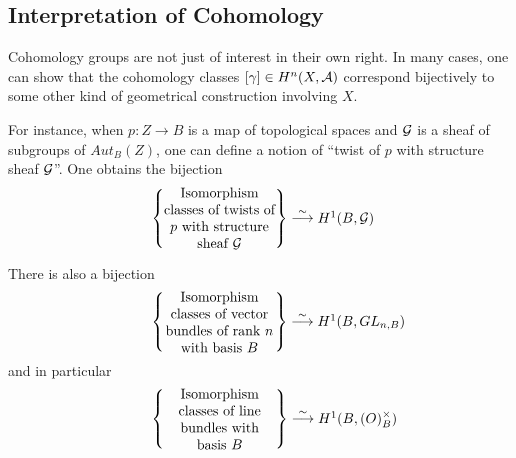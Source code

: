 
\subsection{Interpretation of Cohomology}
Cohomology groups are not just of interest in their own right. In many cases, one can show that the cohomology classes $[\gamma] \in H^n(X, \mathcal{A})$ correspond bijectively to some other kind of geometrical construction involving $X$.

For instance, when $p:Z \to B$ is a map of topological spaces and $\mathcal{G}$  is a sheaf of subgroups of $Aut_B(Z)$, one can define a notion of “twist of $p$ with structure sheaf $\mathcal{G}$”. One obtains the bijection
\begin{align}
            \left\{ \parbox[c]{1.1in}{\centering
                       Isomorphism classes of twists of $p$
                       with structure sheaf $\Sh{G}$}
            \right\}
            \stackrel{\sim}{\to}
            \parbox[c]{0.5in}{\centering
                       $H^1(B, \Sh{G})$}
\end{align}

There is also a bijection
\begin{align}
            \left\{ \parbox[c]{1.1in}{\centering
              Isomorphism classes of vector bundles of rank $n$ with basis $B$}
            \right\}
            \stackrel{\sim}{\to}
            \parbox[c]{0.5in}{\centering
            $H^1(B, GL_{n,B})$}
\end{align}
and in particular
\begin{align}
            \left\{ \parbox[c]{1.1in}{\centering
            Isomorphism classes of line bundles with basis $B$}
            \right\}
            \stackrel{\sim}{\to}
            \parbox[c]{0.5in}{\centering
                $H^1(B, \Ring(O)_B^\times)$}
\end{align}

